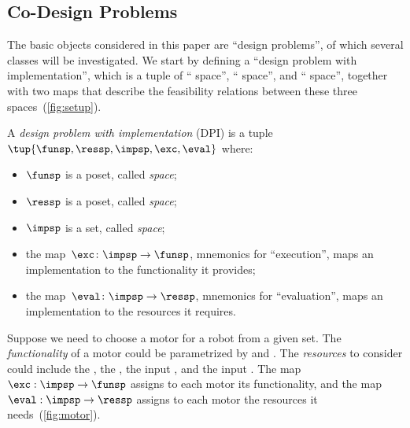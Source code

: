 

\subsection{Co-Design Problems\label{sec:Design-Problems}}

The basic objects considered in this paper are ``design problems'',
of which several classes will be investigated. We start by defining
a ``design problem with implementation'', which is a tuple of ``
space'', `` space'', and ``
space'', together with two maps that describe the feasibility relations
between these three spaces~(\cref{fig:setup}).
\begin{definition}
\label{def:design_problem}A \emph{design problem with implementation}
(DPI) is a tuple $\tup{\funsp,\ressp,\impsp,\exc,\eval}$
where:

\begin{itemize}
\item $\funsp$ is a poset, called \emph{ space};
\item $\ressp$ is a poset, called \emph{ space};
\item $\impsp$ is a set, called \emph{ space};
\item the map~$\exc\colon\impsp\rightarrow\funsp$, mnemonics for ``execution'',
maps an implementation to the functionality it provides;
\item the map~$\eval\colon\impsp\rightarrow\ressp$, mnemonics for ``evaluation'',
maps an implementation to the resources it requires.
\end{itemize}
\end{definition}

\begin{example}
\label{exa:motor}Suppose we need to choose a motor for a robot from
a given set. The \emph{functionality} of a motor could be parametrized
by  and . The \emph{resources} to consider
could include the , the , the
input , and the input .
The map~$\exc:\impsp\rightarrow\funsp$ assigns to each motor its
functionality, and the map~$\eval:\impsp\rightarrow\ressp$ assigns
to each motor the resources it needs~(\cref{fig:motor}).
\end{example}


